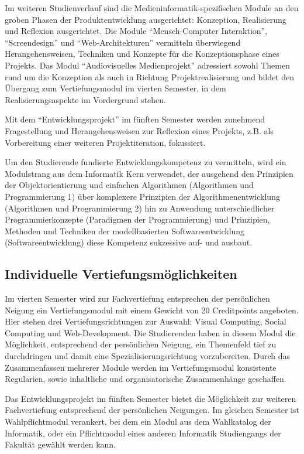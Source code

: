 Im weiteren Studienverlauf sind die Medieninformatik-spezifischen Module
an den groben Phasen der Produktentwicklung ausgerichtet: Konzeption,
Realisierung und Reflexion ausgerichtet. Die Module ``Mensch-Computer
Interaktion'', ``Screendesign'' und ``Web-Architekturen'' vermitteln
überwiegend Herangehensweisen, Techniken und Konzepte für die
Konzeptionsphase eines Projekts. Das Modul ``Audiovisuelles
Medienprojekt'' adressiert sowohl Themen rund um die Konzeption als auch
in Richtung Projektrealisierung und bildet den Übergang zum
Vertiefungsmodul im vierten Semester, in dem Realisierungsaspekte im
Vordergrund stehen.

Mit dem ``Entwicklungsprojekt'' im fünften Semester werden zunehmend
Fragestellung und Herangehensweisen zur Reflexion eines Projekts, z.B.
als Vorbereitung einer weiteren Projektiteration, fokussiert.

Um den Studierende fundierte Entwicklungskompetenz zu vermitteln, wird
ein Modulstrang aus dem Informatik Kern verwendet, der ausgehend den
Prinzipien der Objektorientierung und einfachen Algorithmen (Algorithmen
und Programmierung 1) über komplexere Prinzipien der
Algorithmenentwicklung (Algorithmen und Programmierung 2) hin zu
Anwendung unterschiedlicher Programmierkonzepte (Paradigmen der
Programmierung) und Prinzipien, Methoden und Techniken der
modellbasierten Softwareentwicklung (Softwareentwicklung) diese
Kompetenz sukzessive auf- und ausbaut.

\subsection{Individuelle
Vertiefungsmöglichkeiten}\label{individuelle-vertiefungsmuxf6glichkeiten}

Im vierten Semester wird zur Fachvertiefung entsprechen der persönlichen
Neigung ein Vertiefungsmodul mit einem Gewicht von 20 Creditpoints
angeboten. Hier stehen drei Vertiefungsrichtungen zur Auswahl: Visual
Computing, Social Computing und Web-Development. Die Studierenden haben
in diesem Modul die Möglichkeit, entsprechend der persönlichen Neigung,
ein Themenfeld tief zu durchdringen und damit eine
Spezialisierungsrichtung vorzubereiten. Durch das Zusammenfassen
mehrerer Module werden im Vertiefungsmodul konsistente Regularien, sowie
inhaltliche und organisatorische Zusammenhänge geschaffen.

Das Entwicklungsprojekt im fünften Semester bietet die Möglichkeit zur
weiteren Fachvertiefung entsprechend der persönlichen Neigungen. Im
gleichen Semester ist Wahlpflichtmodul verankert, bei dem ein Modul aus
dem Wahlkatalog der Informatik, oder ein Pflichtmodul eines anderen
Informatik Studiengangs der Fakultät gewählt werden kann.

